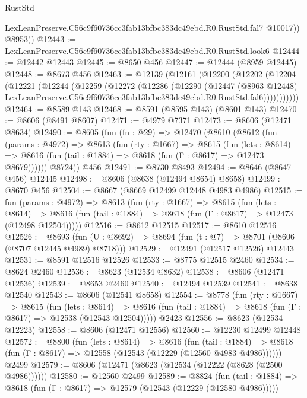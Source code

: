 \begin{lexlean}{RustStd}
\begin{coremodule}
            LexLeanPreserve.C56c9f60736cc3fab13bfbc383dc49ebd.R0.RustStd.fal7
            @10017))
        @8953))
@12443 := LexLeanPreserve.C56c9f60736cc3fab13bfbc383dc49ebd.R0.RustStd.look6
@12444 := @12442 @12443
@12445 := @8650 @456
@12447 := @12444 (@8959 @12445)
@12448 := @8673 @456
@12463 := @12139
    (@12161
      (@12200
        (@12202
          (@12204
            (@12221
              (@12244
                (@12259
                  (@12272
                    (@12286
                      (@12290
                        (@12447
                          (@8963 @12448)
                          LexLeanPreserve.C56c9f60736cc3fab13bfbc383dc49ebd.R0.RustStd.fal6)))))))))))
@12464 := @8589 @143
@12468 := @8591 (@8595 @143) (@8601 @143)
@12470 := @8606 (@8491 @8607)
@12471 := @4979 @7371
@12473 := @8606 (@12471 @8634)
@12490 := @8605
    (fun (fn : @29) =>
    @12470
      (@8610
        (@8612
          (fun (params : @4972) =>
          @8613
            (fun (rty : @1667) =>
            @8615
              (fun (lets : @8614) =>
              @8616 (fun (tail : @1884) => @8618 (fun (Γ : @8617) => @12473 @8679))))))
        @8724))
    @456
@12491 := @8730 @8493
@12494 := @8646 (@8647 @456) @12445
@12498 := @8606 (@8638 (@12494 @8654) @8658)
@12499 := @8670 @456
@12504 := @8667 (@8669 @12499 @12448 @4983 @4986)
@12515 := fun (params : @4972) =>
  @8613
    (fun (rty : @1667) =>
    @8615
      (fun (lets : @8614) =>
      @8616 (fun (tail : @1884) => @8618 (fun (Γ : @8617) => @12473 (@12498 @12504)))))
@12516 := @8612 @12515
@12517 := @8610 @12516
@12526 := @8693
    (fun (U : @8692) => @8694 (fun (t : @7) => @8701 (@8606 (@8707 @12445 @4989) @8718)))
@12529 := @12491 (@12517 @12526) @12443
@12531 := @8591 @12516 @12526
@12533 := @8775 @12515 @2460
@12534 := @8624 @2460
@12536 := @8623 (@12534 @8632)
@12538 := @8606 (@12471 @12536)
@12539 := @8653 @2460
@12540 := @12494 @12539
@12541 := @8638 @12540
@12543 := @8606 (@12541 @8658)
@12554 := @8778
    (fun (rty : @1667) =>
    @8615
      (fun (lets : @8614) =>
      @8616 (fun (tail : @1884) => @8618 (fun (Γ : @8617) => @12538 (@12543 @12504)))))
    @2423
@12556 := @8623 (@12534 @12223)
@12558 := @8606 (@12471 @12556)
@12560 := @12230 @12499 @12448
@12572 := @8800
    (fun (lets : @8614) =>
    @8616
      (fun (tail : @1884) =>
      @8618 (fun (Γ : @8617) => @12558 (@12543 (@12229 (@12560 @4983 @4986))))))
    @2499
@12579 := @8606 (@12471 (@8623 (@12534 (@12222 (@8628 (@2500 @4986))))))
@12580 := @12560 @2499
@12589 := @8824
    (fun (tail : @1884) => @8618 (fun (Γ : @8617) => @12579 (@12543 (@12229 (@12580 @4986)))))

\end{coremodule}
\end{lexlean}
